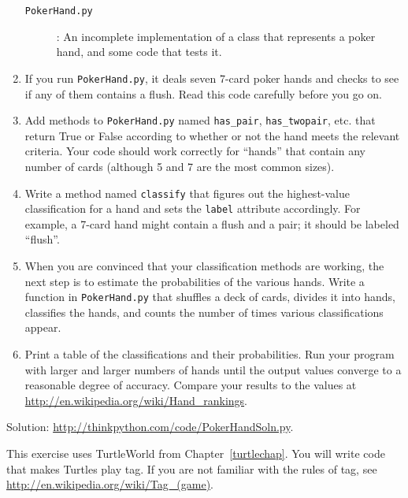 \documentclass[10pt]{book}
\begin{document}
\begin{CJK}{UTF8}{gbsn}
\begin{exercise}
\begin{enumerate}
\begin{description}
\item[{\tt PokerHand.py}]: An incomplete implementation of a class
that represents a poker hand, and some code that tests it.

\end{description}
%
\item If you run {\tt PokerHand.py}, it deals seven 7-card poker hands
and checks to see if any of them contains a flush.  Read this
code carefully before you go on.

\item Add methods to {\tt PokerHand.py} named \verb"has_pair",
\verb"has_twopair", etc. that return True or False according to
whether or not the hand meets the relevant criteria.  Your code should
work correctly for ``hands'' that contain any number of cards
(although 5 and 7 are the most common sizes).

\item Write a method named {\tt classify} that figures out
the highest-value classification for a hand and sets the
{\tt label} attribute accordingly.  For example, a 7-card hand
might contain a flush and a pair; it should be labeled ``flush''.

\item When you are convinced that your classification methods are
working, the next step is to estimate the probabilities of the various
hands.  Write a function in {\tt PokerHand.py} that shuffles a deck of
cards, divides it into hands, classifies the hands, and counts the
number of times various classifications appear.

\item Print a table of the classifications and their probabilities.
Run your program with larger and larger numbers of hands until the
output values converge to a reasonable degree of accuracy.  Compare
your results to the values at \url{http://en.wikipedia.org/wiki/Hand_rankings}.

\end{enumerate}

Solution: \url{http://thinkpython.com/code/PokerHandSoln.py}.
\end{exercise}


\begin{exercise}

This exercise uses TurtleWorld from Chapter~\ref{turtlechap}.
You will write code that makes Turtles play tag.  If you
are not familiar with the rules of tag, see
\url{http://en.wikipedia.org/wiki/Tag_(game)}.


\end{exercise}
\end{CJK}
\end{document}

